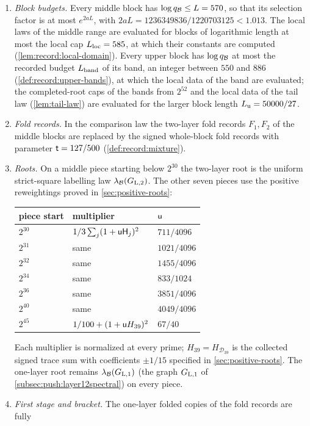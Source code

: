 \begin{definition}[Parameters]
\begin{enumerate}[label=(\alph*)]
 Every other prime ($2$, and the primes $p\equiv3\pmod4$ below $Q_3$) divides
 $\Mzero$.
\item \emph{Block budgets.} Every middle block has $\log q_{\mathcal B}\le L=570$, so
 that its selection factor is at most $e^{2aL}$, with
 $2aL=1236349836/1220703125<1.013$. The local laws of the middle range are
 evaluated for blocks of logarithmic length at most the local cap
 $L_{\rm loc}=585$, at which their constants are computed
 (\cref{lem:record:local-domain}). Every upper block has $\log q_{\mathcal B}$ at
 most the recorded budget $L_{\rm band}$ of its band, an integer between $550$
 and $886$ (\cref{def:record:upper-bands}), at which the local data of the band
 are evaluated; the completed-root caps of the bands from $2^{52}$ and the
 local data of the tail law (\cref{lem:tail-law}) are evaluated for the larger block length
 $L_{\rm u}=50000/27$.
\item \emph{Fold records.} In the comparison law the two-layer fold records
 $F_1,F_2$ of the middle blocks are replaced by the signed whole-block fold
 records with parameter $\mathsf t=127/500$ (\cref{def:record:mixture}).
\item \emph{Roots.} On a middle piece starting below $2^{30}$ the
 two-layer root is the uniform strict-square labelling law
 $\lambda_{\mathcal B}(G_{\rm L,2})$. The other seven pieces use the positive
 reweightings proved in \cref{sec:positive-roots}:
 \begin{center}
 \begin{tabular}{lll}
 piece start & multiplier & $\mathsf u$\\ \hline
 $2^{30}$ & $1/3\sum_j(1+\mathsf u\mathsf H_{j})^2$ & $711/4096$\\
 $2^{31}$ & same & $1021/4096$\\
 $2^{32}$ & same & $1455/4096$\\
 $2^{34}$ & same & $833/1024$\\
 $2^{36}$ & same & $3851/4096$\\
 $2^{40}$ & same & $4049/4096$\\
 $2^{45}$ & $1/100+(1+\mathsf u H_{39})^2$ & $67/40$
 \end{tabular}
 \end{center}
 Each multiplier is normalized at every prime; $H_{39}=H_{\mathcal D_{39}}$ is the collected signed trace sum with coefficients
 $\pm1/15$ specified in \cref{sec:positive-roots}.
 The one-layer root remains $\lambda_{\mathcal B}(G_{\rm L,1})$ (the graph
 $G_{\rm L,1}$ of \cref{subsec:push:layer12spectral}) on every piece.
\item \emph{First stage and bracket.} The one-layer folded copies of the fold records are fully

\end{enumerate}
\end{definition}
